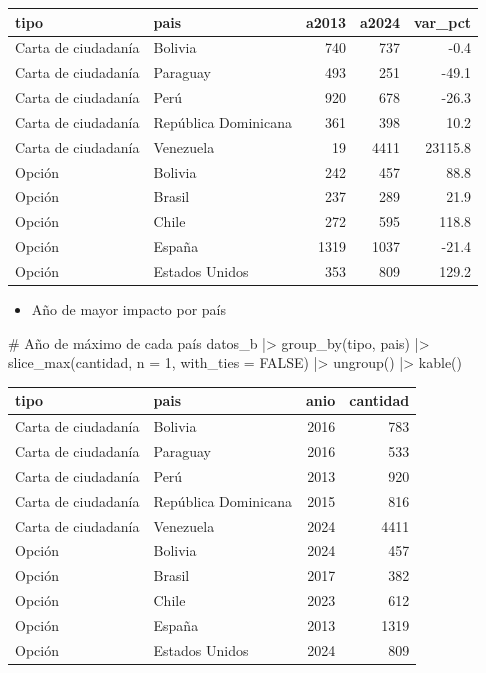 \documentclass[
  letterpaper,
  DIV=11,
  numbers=noendperiod]{scrartcl}
\newenvironment{Shaded}{\begin{snugshade}}{\end{snugshade}}
\newcommand{\AttributeTok}[1]{\textcolor[rgb]{0.40,0.45,0.13}{#1}}
\newcommand{\CommentTok}[1]{\textcolor[rgb]{0.37,0.37,0.37}{#1}}
\newcommand{\ConstantTok}[1]{\textcolor[rgb]{0.56,0.35,0.01}{#1}}
\newcommand{\DecValTok}[1]{\textcolor[rgb]{0.68,0.00,0.00}{#1}}
\newcommand{\FunctionTok}[1]{\textcolor[rgb]{0.28,0.35,0.67}{#1}}
\newcommand{\NormalTok}[1]{\textcolor[rgb]{0.00,0.23,0.31}{#1}}
\newcommand{\SpecialCharTok}[1]{\textcolor[rgb]{0.37,0.37,0.37}{#1}}
\providecommand{\tightlist}{%
  \setlength{\itemsep}{0pt}\setlength{\parskip}{0pt}}\usepackage{longtable,booktabs,array}
\begin{document}
\begin{longtable}[]{@{}llrrr@{}}
\toprule\noalign{}
tipo & pais & a2013 & a2024 & var\_pct \\
\midrule\noalign{}
\endhead
\bottomrule\noalign{}
\endlastfoot
Carta de ciudadanía & Bolivia & 740 & 737 & -0.4 \\
Carta de ciudadanía & Paraguay & 493 & 251 & -49.1 \\
Carta de ciudadanía & Perú & 920 & 678 & -26.3 \\
Carta de ciudadanía & República Dominicana & 361 & 398 & 10.2 \\
Carta de ciudadanía & Venezuela & 19 & 4411 & 23115.8 \\
Opción & Bolivia & 242 & 457 & 88.8 \\
Opción & Brasil & 237 & 289 & 21.9 \\
Opción & Chile & 272 & 595 & 118.8 \\
Opción & España & 1319 & 1037 & -21.4 \\
Opción & Estados Unidos & 353 & 809 & 129.2 \\
\end{longtable}

\begin{itemize}
\tightlist
\item
  Año de mayor impacto por país
\end{itemize}

\begin{Shaded}
\begin{Highlighting}[]
\CommentTok{\# Año de máximo de cada país}
\NormalTok{datos\_b }\SpecialCharTok{|\textgreater{}}
  \FunctionTok{group\_by}\NormalTok{(tipo, pais) }\SpecialCharTok{|\textgreater{}}
  \FunctionTok{slice\_max}\NormalTok{(cantidad, }\AttributeTok{n =} \DecValTok{1}\NormalTok{, }\AttributeTok{with\_ties =} \ConstantTok{FALSE}\NormalTok{) }\SpecialCharTok{|\textgreater{}}
  \FunctionTok{ungroup}\NormalTok{() }\SpecialCharTok{|\textgreater{}} 
  \FunctionTok{kable}\NormalTok{()}
\end{Highlighting}
\end{Shaded}

\begin{longtable}[]{@{}llrr@{}}
\toprule\noalign{}
tipo & pais & anio & cantidad \\
\midrule\noalign{}
\endhead
\bottomrule\noalign{}
\endlastfoot
Carta de ciudadanía & Bolivia & 2016 & 783 \\
Carta de ciudadanía & Paraguay & 2016 & 533 \\
Carta de ciudadanía & Perú & 2013 & 920 \\
Carta de ciudadanía & República Dominicana & 2015 & 816 \\
Carta de ciudadanía & Venezuela & 2024 & 4411 \\
Opción & Bolivia & 2024 & 457 \\
Opción & Brasil & 2017 & 382 \\
Opción & Chile & 2023 & 612 \\
Opción & España & 2013 & 1319 \\
Opción & Estados Unidos & 2024 & 809 \\
\end{longtable}
\end{document}
